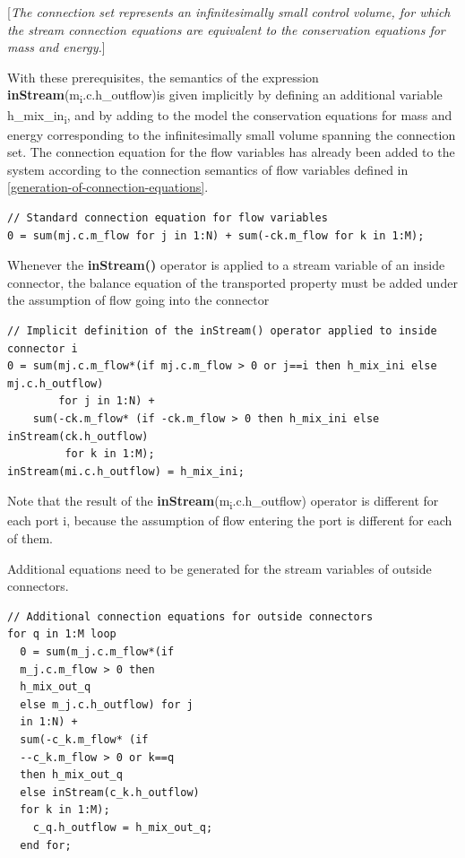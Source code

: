 \documentclass[10pt,a4paper]{report}
\begin{document}
{[}\emph{The connection set represents an infinitesimally small control
volume, for which the stream connection equations are equivalent to the
conservation equations for mass and energy.}{]}

With these prerequisites, the semantics of the expression
\textbf{inStream}(m\textsubscript{i}.c.h\_outflow)is given implicitly by
defining an additional variable h\_mix\_in\textsubscript{i}, and by
adding to the model the conservation equations for mass and energy
corresponding to the infinitesimally small volume spanning the
connection set. The connection equation for the flow variables has
already been added to the system according to the connection semantics
of flow variables defined in \ref{generation-of-connection-equations}.

\begin{lstlisting}[language=modelica]
// Standard connection equation for flow variables
0 = sum(mj.c.m_flow for j in 1:N) + sum(-ck.m_flow for k in 1:M);
\end{lstlisting}

Whenever the \textbf{inStream()} operator is applied to a stream
variable of an inside connector, the balance equation of the transported
property must be added under the assumption of flow going into the
connector

\begin{lstlisting}[language=modelica]
// Implicit definition of the inStream() operator applied to inside connector i
0 = sum(mj.c.m_flow*(if mj.c.m_flow > 0 or j==i then h_mix_ini else mj.c.h_outflow)
        for j in 1:N) +
    sum(-ck.m_flow* (if -ck.m_flow > 0 then h_mix_ini else inStream(ck.h_outflow)
         for k in 1:M);
inStream(mi.c.h_outflow) = h_mix_ini;
\end{lstlisting}

Note that the result of the
\textbf{inStream}(m\textsubscript{i}.c.h\_outflow) operator is different
for each port i, because the assumption of flow entering the port is
different for each of them.

Additional equations need to be generated for the stream variables of
outside connectors.

\begin{lstlisting}[language=modelica]
// Additional connection equations for outside connectors
for q in 1:M loop
  0 = sum(m_j.c.m_flow*(if
  m_j.c.m_flow > 0 then
  h_mix_out_q
  else m_j.c.h_outflow) for j
  in 1:N) +
  sum(-c_k.m_flow* (if
  --c_k.m_flow > 0 or k==q
  then h_mix_out_q
  else inStream(c_k.h_outflow)
  for k in 1:M);
    c_q.h_outflow = h_mix_out_q;
  end for;
\end{lstlisting}
\end{document}
